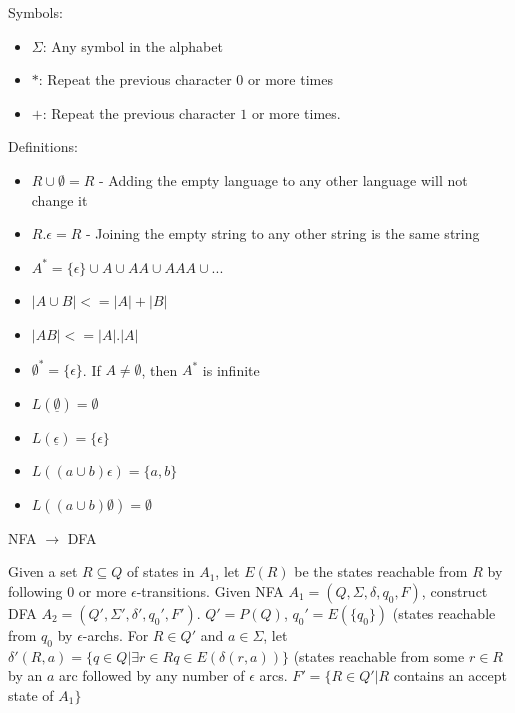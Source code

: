 \documentclass[2pt]{scrartcl}
\makeatletter
\renewcommand{\subsection}{\@startsection{subsection}{2}{0mm}
  {-1explus -.5ex minus -.2ex}
  {0.5ex plus .2ex}
{\normalfont\normalsize\bfseries}}
\makeatother
\begin{document}
\begin{multicols}{6}
  Symbols:
  \begin{itemize}
    \item $\Sigma$: Any symbol in the alphabet
    \item $*$: Repeat the previous character $0$ or more times
    \item $+$: Repeat the previous character $1$ or more times.
  \end{itemize}
  Definitions:
  \begin{multicols}{2}
    \begin{itemize}
      \item $R \cup \emptyset = R$ - Adding the empty language to any other language will not change it
      \item $R . \epsilon = R$ - Joining the empty string to any other string is the same string
      \item $A^* = \{\epsilon\} \cup A \cup AA \cup AAA \cup ...$
      \item $|A \cup B| <= |A| + |B|$
      \item $|AB| <= |A| . |A|$
      \item $\emptyset^* = \{\epsilon\}$. If $A \neq \emptyset$, then $A^*$ is infinite
      \item $L(\underline{\emptyset}) = \emptyset$
      \item $L(\underline{\epsilon}) = \{\epsilon\}$
      \item $L((a \cup b)\epsilon) = \{a, b\}$
      \item $L((a \cup b)\emptyset) = \emptyset$
    \end{itemize}
  \end{multicols}

  \subsection{NFA $\rightarrow$ DFA}

  Given a set $R \subseteq Q$ of states in $A_1$, let $E(R)$ be the states reachable from $R$ by following $0$ or more $\epsilon$-transitions. Given NFA $A_1 = (Q, \Sigma, \delta, q_0, F)$, construct DFA $A_2 = (Q', \Sigma', \delta', q_0', F')$. $Q' = P(Q)$, $q_0' = E(\{q_0\})$ (states reachable from $q_0$ by $\epsilon$-archs. For $R \in Q'$ and $a \in \Sigma$, let $\delta'(R, a) = \{q \in Q | \exists r \in R q \in E(\delta(r, a))\}$ (states reachable from some $r \in R$ by an $a$ arc followed by any number of $\epsilon$ arcs. $F' = \{R \in Q' | R$ contains an accept state of $A_1\}$


\end{multicols}
\end{document}
